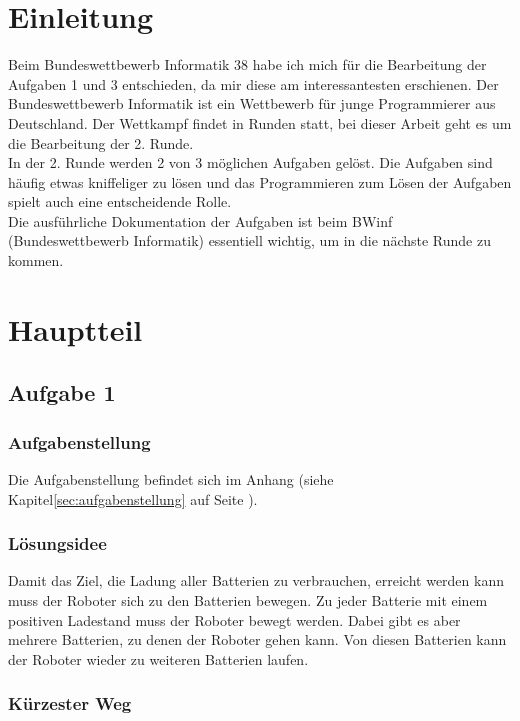 \documentclass[a4paper,12pt,arial]{scrartcl}
\begin{document}
\section{Einleitung}
Beim Bundeswettbewerb Informatik 38 habe ich mich für die Bearbeitung der Aufgaben 1 und 3 entschieden, da mir diese am interessantesten erschienen. Der Bundeswettbewerb Informatik ist ein Wettbewerb für junge Programmierer aus Deutschland. Der Wettkampf findet in Runden statt, bei dieser Arbeit geht es um die Bearbeitung der 2. Runde.
\\
In der 2. Runde werden 2 von 3 möglichen Aufgaben gelöst. Die Aufgaben sind häufig etwas kniffeliger zu lösen und das Programmieren zum Lösen der Aufgaben spielt auch eine entscheidende Rolle.\\
Die ausführliche Dokumentation der Aufgaben ist beim BWinf (Bundeswettbewerb Informatik) essentiell wichtig, um in die nächste Runde zu kommen.\cite{bundesWettbewerbInformatik}
\section{Hauptteil}
\subsection{Aufgabe 1}
\subsubsection{Aufgabenstellung}
Die Aufgabenstellung befindet sich im Anhang (siehe Kapitel\ref{sec:aufgabenstellung} auf Seite \pageref{sec:aufgabenstellung}).\textit{\textcite{bwinfSpielfeld}}
\subsubsection{Lösungsidee}
Damit das Ziel, die Ladung aller Batterien zu verbrauchen, erreicht werden kann muss der Roboter sich zu den Batterien bewegen.
Zu jeder Batterie mit einem positiven Ladestand muss der Roboter bewegt werden. Dabei gibt es aber mehrere Batterien, zu denen der Roboter gehen kann. Von diesen Batterien kann der Roboter wieder zu weiteren Batterien laufen.
\par
\subsubsection{Kürzester Weg}
\end{document}
